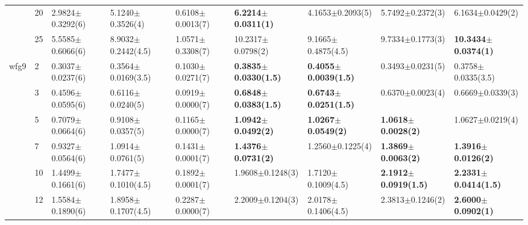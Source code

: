 \begin{table*}[]
\begin{adjustbox}{width=1.0\textwidth,center}
\begin{tabular}{lllllllll}
      & 20                             & 2.9824$\pm$0.3292(6)         & 5.1240$\pm$0.3526(4)          & 0.6108$\pm$0.0013(7)              & \textbf{6.2214$\pm$0.0311(1)}                     & 4.1653$\pm$0.2093(5)                     & 5.7492$\pm$0.2372(3)                       & 6.1634$\pm$0.0429(2)            \\
      & 25                             & 5.5585$\pm$0.6066(6)         & 8.9032$\pm$0.2442(4.5)        & 1.0571$\pm$0.3308(7)              & 10.2317$\pm$0.0798(2)                             & 9.1665$\pm$0.4875(4.5)                   & 9.7334$\pm$0.1773(3)                       & \textbf{10.3434$\pm$0.0374(1)}  \\\thickhline
wfg9  & 2                              & 0.3037$\pm$0.0237(6)         & 0.3564$\pm$0.0169(3.5)        & 0.1030$\pm$0.0271(7)              & \textbf{0.3835$\pm$0.0330(1.5)}                   & \textbf{0.4055$\pm$0.0039(1.5)}          & 0.3493$\pm$0.0231(5)                       & 0.3758$\pm$0.0335(3.5)          \\
      & 3                              & 0.4596$\pm$0.0595(6)         & 0.6116$\pm$0.0240(5)          & 0.0919$\pm$0.0000(7)              & \textbf{0.6848$\pm$0.0383(1.5)}                   & \textbf{0.6743$\pm$0.0251(1.5)}          & 0.6370$\pm$0.0023(4)                       & 0.6669$\pm$0.0339(3)            \\
      & 5                              & 0.7079$\pm$0.0664(6)         & 0.9108$\pm$0.0357(5)          & 0.1165$\pm$0.0000(7)              & \textbf{1.0942$\pm$0.0492(2)}                     & \textbf{1.0267$\pm$0.0549(2)}            & \textbf{1.0618$\pm$0.0028(2)}              & 1.0627$\pm$0.0219(4)            \\
      & 7                              & 0.9327$\pm$0.0564(6)         & 1.0914$\pm$0.0761(5)          & 0.1431$\pm$0.0001(7)              & \textbf{1.4376$\pm$0.0731(2)}                     & 1.2560$\pm$0.1225(4)                     & \textbf{1.3869$\pm$0.0063(2)}              & \textbf{1.3916$\pm$0.0126(2)}   \\
      & 10                             & 1.4499$\pm$0.1661(6)         & 1.7477$\pm$0.1010(4.5)        & 0.1892$\pm$0.0001(7)              & 1.9608$\pm$0.1248(3)                              & 1.7120$\pm$0.1009(4.5)                   & \textbf{2.1912$\pm$0.0919(1.5)}            & \textbf{2.2331$\pm$0.0414(1.5)} \\
      & 12                             & 1.5584$\pm$0.1890(6)         & 1.8958$\pm$0.1707(4.5)        & 0.2287$\pm$0.0000(7)              & 2.2009$\pm$0.1204(3)                              & 2.0178$\pm$0.1406(4.5)                   & 2.3813$\pm$0.1246(2)                       & \textbf{2.6000$\pm$0.0902(1)}   \\

\end{tabular}
\end{adjustbox}
\end{table*}
